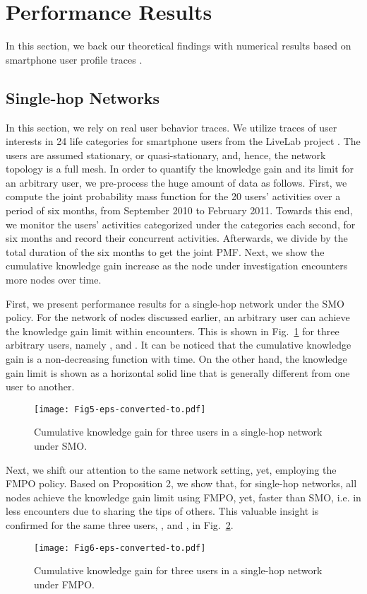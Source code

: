 \documentclass[conference]{IEEEtran}
\theoremstyle{definition}
\begin{document}
\vspace{-0.3 cm}
\section{Performance Results}


In this section, we back our theoretical findings with numerical results based on 
smartphone user profile traces \cite{data}.
\vspace{-0.4 cm}
\subsection{Single-hop Networks}
\vspace{-0.1 cm}
In this section, we rely on real user behavior traces. We utilize traces of user interests in 24 life categories for  smartphone users from the LiveLab project \cite{data}. The users are assumed stationary, or quasi-stationary, and, hence, the network topology is a full mesh. In order to quantify the knowledge gain and its limit for an arbitrary user, we pre-process the huge amount of data as follows. First, we compute the joint probability mass function for the 20 users' activities over a period of six months, from September 2010 to February 2011. Towards this end, we monitor the users' activities categorized under the  categories
each second, for six months and record their concurrent activities. Afterwards, we divide by the total duration of the six months to get the joint PMF. Next, we show the cumulative knowledge gain increase as the node under investigation encounters more nodes over time.


First, we present performance results for a single-hop network under the 
SMO policy. For the network of  nodes discussed earlier, an 
arbitrary user can achieve the knowledge gain limit within  encounters. This is shown in Fig.~\ref{fig:B00_SSHOP)} for three arbitrary users, namely ,  and . It can be noticed that the cumulative knowledge gain is a non-decreasing function with time. On the other hand, the knowledge gain limit is shown as a horizontal solid line that is generally different from one user to another.
\begin{figure}[!tp]
\texttt{[image: Fig5-eps-converted-to.pdf]}
\caption{Cumulative knowledge gain for three users in a single-hop network under SMO.}\label{fig:B00_SSHOP)}
\end{figure}


Next, we shift our attention to the same network setting, yet, employing the FMPO policy.
Based on Proposition 2, we show that, for single-hop networks, all nodes achieve the knowledge gain limit using FMPO, yet, faster than SMO, i.e. in less encounters due to sharing the tips of others. This valuable insight is confirmed for the same three users, ,  and , in Fig.~\ref{fig:B00_SSHOP(MO)}.
\begin{figure}[!bp]
\centerline{  \texttt{[image: Fig6-eps-converted-to.pdf]}}
\caption{Cumulative knowledge gain for three users in a single-hop network under FMPO.}\label{fig:B00_SSHOP(MO)}
\end{figure}
\vspace{-0.1 cm}
\end{document}

